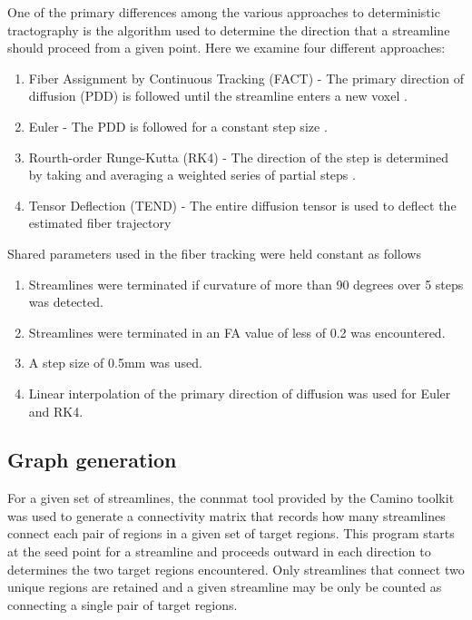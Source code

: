 \documentclass{frontiersSCNS} %
\begin{document}

One of the primary differences among the various approaches to
deterministic tractography is the algorithm used to determine the
direction that a streamline should proceed from a given point. Here we
examine four different approaches:

\begin{enumerate}
\item Fiber Assignment by Continuous Tracking (FACT) - The primary
  direction of diffusion (PDD) is followed until the streamline enters
  a new voxel \citep{Mori1999}.
\item Euler -  The PDD is followed for a constant step size \citep{Basser2000}.
\item Rourth-order Runge-Kutta (RK4) - The direction of the step is determined
 by taking and averaging a weighted series of partial steps \citep{Basser2000}.
\item Tensor Deflection (TEND) - The entire diffusion tensor is used to deﬂect
the estimated ﬁber trajectory \citep{Lazar2003}
\end{enumerate}

Shared parameters used in the fiber tracking were held constant as follows
\begin{enumerate}
\item Streamlines were terminated if curvature of more than 90 degrees over 5 steps was detected. 
\item Streamlines were terminated in an FA value of less of 0.2 was encountered. 
\item A step size of 0.5mm was used. 
\item Linear interpolation of the primary direction of diffusion was used for Euler and RK4. 
\end{enumerate}


\subsection{Graph generation}
For a given set of streamlines, the connmat tool provided by  the Camino toolkit was used to generate
a connectivity matrix that records how many streamlines connect each pair of
regions in a given set of target regions. This program starts at the seed point for a streamline and proceeds outward in each
direction to determines the two target regions encountered. Only streamlines that connect two unique regions are retained and
a given streamline may be only be counted as connecting a single pair of target regions. 
\end{document}
